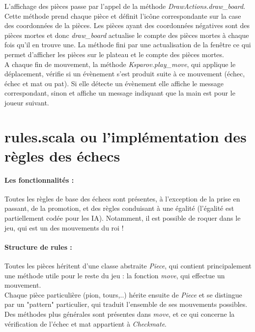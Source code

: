 \documentclass[a4paper]{article}
\begin{document}
L'affichage des pièces passe par l'appel de la méthode \textit{DrawActions.draw\_board}. Cette méthode prend chaque pièce et définit l'icône correspondante sur la case des coordonnées de la pièces. Les pièces ayant des coordonnées négatives sont des pièces mortes et donc \textit{draw\_board} actualise le compte des pièces mortes à chaque fois qu'il en trouve une. La méthode fini par une actualisation de la fenêtre ce qui permet d'afficher les pièces sur le plateau et le compte des pièces mortes. \\

A chaque fin de mouvement, la méthode \textit{Ksparov.play\_move}, qui applique le déplacement, vérifie si un évènement s'est produit suite à ce mouvement (échec, échec et mat ou pat). Si elle détecte un évènement elle affiche le message correspondant, sinon et affiche un message indiquant que la main est pour le joueur suivant.

\section{rules.scala ou l'implémentation des règles des échecs}

\paragraph{Les fonctionnalités :} Toutes les règles de base des échecs sont présentes, à l'exception de la prise en passant, de la promotion, et des règles conduisant à une égalité (l'égalité est partiellement codée pour les IA). Notamment, il est possible de roquer dans le jeu, qui est un des mouvements du roi !

\paragraph{Structure de rules :} Toutes les pièces héritent d'une classe abstraite \textit{Piece}, qui contient principalement une méthode utile pour le reste du jeu : la fonction \textit{move}, qui effectue un mouvement. \\
Chaque pièce particulière (pion, tours,..) hérite ensuite de \textit{Piece} et se distingue par un "pattern" particulier, qui traduit l'ensemble de ses mouvements possibles. \\

Des méthodes plus générales sont présentes dans \textit{move}, et ce qui concerne la vérification de l'échec et mat appartient à \textit{Checkmate}.
\end{document}
